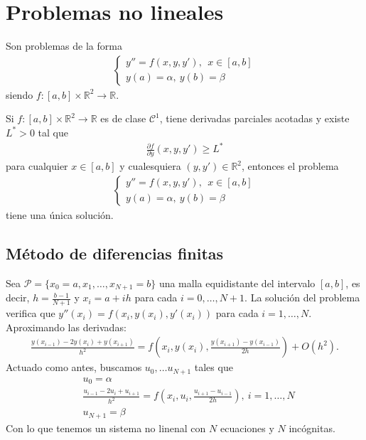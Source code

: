 \section{Problemas no lineales}
Son problemas de la forma
\begin{align*}
    \left\{ \begin{array}{lcc}
                y'' = f(x,y,y'), \ \ x \in [a,b] \\
                y(a) = \alpha, \ y(b) = \beta
            \end{array}
    \right.
\end{align*}
siendo $f: [a,b] \times \mathbb{R}^2 \longrightarrow \mathbb{R}$.

\begin{teo}
    Si $f: [a,b] \times \mathbb{R}^2 \longrightarrow \mathbb{R}$ es de clase $\mathcal{C}^1$, tiene derivadas parciales acotadas y existe $L^* > 0$ tal que
    \begin{align*}
        \frac{\partial f}{\partial y}(x,y,y') \ge L^*
    \end{align*}
    para cualquier $x \in [a,b]$ y cualesquiera $(y,y') \in \mathbb{R}^2$, entonces el problema
    \begin{align*}
        \left\{ \begin{array}{lcc}
                    y'' = f(x,y,y'), \ \ x \in [a,b] \\
                    y(a) = \alpha, \ y(b) = \beta
                \end{array}
        \right.
    \end{align*}
    tiene una única solución.
\end{teo}

\subsection{Método de diferencias finitas}

Sea $\mathcal{P} = \{ x_0 = a, x_1,\ldots,x_{N+1} = b\}$ una malla equidistante del intervalo $[a,b]$, es decir, $h = \frac{b-1}{N+1}$ y $x_i = a +ih$ para cada $i = 0,\ldots,N+1$. La solución del problema verifica que $y''(x_i) = f(x_i,y(x_i),y'(x_i))$ para cada $i = 1,\ldots,N$. Aproximando las derivadas:
\begin{align*}
    \frac{y(x_{i-1}) - 2y(x_i) +y(x_{i+1})}{h^2} = f\left(x_i,y(x_i), \frac{y(x_{i+1}) -y(x_{i-1})}{2h} \right) + O(h^2).
\end{align*}
Actuado como antes, buscamos $u_0,\ldots u_{N+1}$ tales que
\begin{align*}
     & u_0 = \alpha                                                                                                  \\
     & \frac{u_{i-1} - 2u_i + u_{i+1}}{h^2} = f\left(x_i, u_i, \frac{u_{i+1} -u_{i-1}}{2h} \right), \ i = 1,\ldots,N \\
     & u_{N+1} = \beta
\end{align*}
Con lo que tenemos un sistema no linenal con $N$ ecuaciones y $N$ incógnitas.

